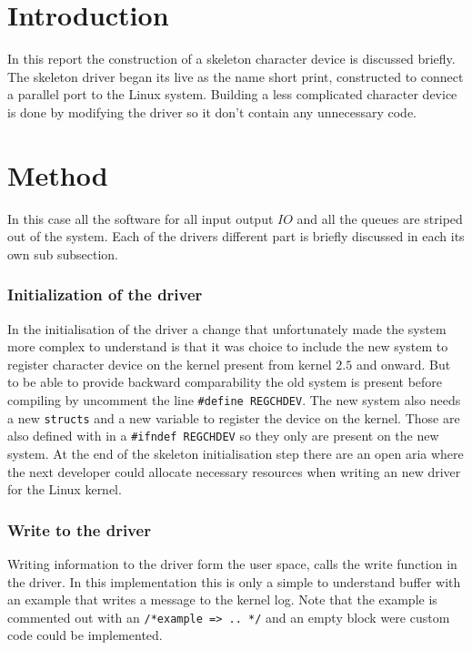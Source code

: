 \section{Introduction}%
\label{sec:introduction}
In this report the construction of a skeleton character device is discussed briefly.
The skeleton driver began its live as the name short print, constructed to connect a parallel port to the Linux system.
Building a less complicated character device is done by modifying the driver so it don't contain any unnecessary code.




\section{Method}%
\label{sec:method}
In this case all the software for all input output \(IO\) and all the queues are striped out of the system.
Each of the drivers different part is briefly discussed in each its own sub subsection.
\subsubsection{Initialization of the driver}%
\label{ssub:method:init}
In the initialisation of the driver a  change that unfortunately made the system more complex to understand is that it was choice to include the new system to register character device on the kernel present from kernel $2.5$ and onward.
But to be able to provide backward comparability the old system is present before compiling by uncomment the line \verb|#define REGCHDEV|.
The new system also needs a new \verb|structs| and a new variable to register the device on the kernel.
Those are also defined with in a \verb|#ifndef REGCHDEV|  so they only are present on the new system.
At the end of the skeleton initialisation step there are an open aria where the next developer could allocate necessary resources when writing an new driver for the Linux kernel.

\subsubsection{Write to the driver}%
\label{ssub:method:write}
Writing information to the driver form the user space, calls the write function in the driver.
In this implementation this is only a simple to understand buffer with an example that writes a message to the kernel log.
Note that the example is commented out with an \verb|/*example => .. */| and an empty block were custom code could be implemented.

